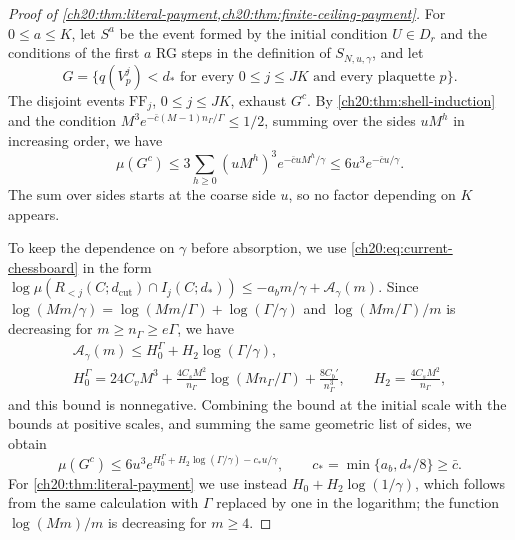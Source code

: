 \begin{proof}[Proof of \cref{ch20:thm:literal-payment,ch20:thm:finite-ceiling-payment}]
For $0\le a\le K$, let $S^a$ be the event formed by the initial condition $U\in D_r$ and the conditions of the first $a$ RG steps in the definition of $S_{N,u,\gamma}$, and let
\[
 G=\{q(V^j_p)<d_*\text{ for every }0\le j\le JK\text{ and every plaquette }p\}.
\]
The disjoint events $\mathrm{FF}_j$, $0\le j\le JK$, exhaust $G^c$. By \cref{ch20:thm:shell-induction} and the condition $M^3e^{-\bar c(M-1)n_\Gamma/\Gamma}\le1/2$, summing over the sides $uM^h$ in increasing order, we have
\begin{equation}\label{ch20:eq:curvature-payment}
 \mu(G^c)\le3\sum_{h\ge0}(uM^h)^3e^{-\bar cuM^h/\gamma}\le6u^3e^{-\bar cu/\gamma}.
\end{equation}
The sum over sides starts at the coarse side $u$, so no factor depending on $K$ appears.

To keep the dependence on $\gamma$ before absorption, we use \eqref{ch20:eq:current-chessboard} in the form $\log\mu(R_{<j}(C;d_{\mathrm{cut}})\cap I_j(C;d_*))\le-a_bm/\gamma+\mathcal A_\gamma(m)$. Since $\log(Mm/\gamma)=\log(Mm/\Gamma)+\log(\Gamma/\gamma)$ and $\log(Mm/\Gamma)/m$ is decreasing for $m\ge n_\Gamma\ge e\Gamma$, we have
\begin{equation}\label{ch20:eq:unabsorbed-entropy}
 \begin{gathered}
 \mathcal A_\gamma(m)\le H_0^\Gamma+H_2\log(\Gamma/\gamma),\\
 H_0^\Gamma=24C_vM^3+\frac{4C_sM^2}{n_\Gamma}\log(Mn_\Gamma/\Gamma)+\frac{8C_b'}{n_\Gamma^3},\qquad
 H_2=\frac{4C_sM^2}{n_\Gamma},
 \end{gathered}
\end{equation}
and this bound is nonnegative. Combining the bound at the initial scale with the bounds at positive scales, and summing the same geometric list of sides, we obtain
\begin{equation}\label{ch20:eq:unabsorbed-curvature}
 \mu(G^c)\le6u^3e^{H_0^\Gamma+H_2\log(\Gamma/\gamma)-c_*u/\gamma},\qquad c_*=\min\{a_b,d_*/8\}\ge\bar c.
\end{equation}
For \cref{ch20:thm:literal-payment} we use instead $H_0+H_2\log(1/\gamma)$, which follows from the same calculation with $\Gamma$ replaced by one in the logarithm; the function $\log(Mm)/m$ is decreasing for $m\ge4$.


\end{proof}
